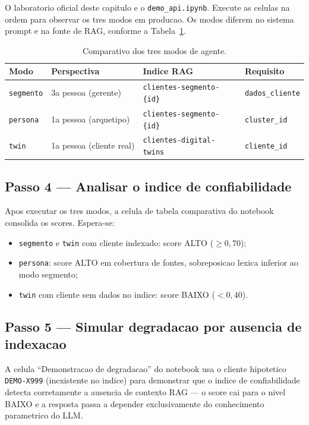 O laboratorio oficial deste capitulo e o \texttt{demo\_api.ipynb}.
Execute as celulas na ordem para observar os tres modos em producao.
Os modos diferem no sistema prompt e na fonte de RAG,
conforme a Tabela~\ref{tab:modos_agente}.

\begin{table}[ht]
\centering
\caption{Comparativo dos tres modos de agente.}
\label{tab:modos_agente}
\begin{tabular}{llll}
\toprule
\textbf{Modo} & \textbf{Perspectiva} & \textbf{Indice RAG} & \textbf{Requisito} \\
\midrule
\texttt{segmento} & 3a pessoa (gerente)    & \texttt{clientes-segmento-\{id\}} & \texttt{dados\_cliente} \\
\texttt{persona}  & 1a pessoa (arquetipo)  & \texttt{clientes-segmento-\{id\}} & \texttt{cluster\_id} \\
\texttt{twin}     & 1a pessoa (cliente real) & \texttt{clientes-digital-twins} & \texttt{cliente\_id} \\
\bottomrule
\end{tabular}
\end{table}

\subsection{Passo 4 --- Analisar o indice de confiabilidade}

Apos executar os tres modos, a celula de tabela comparativa do notebook
consolida os scores. Espera-se:

\begin{itemize}[leftmargin=*]
  \item \texttt{segmento} e \texttt{twin} com cliente indexado:
        score ALTO ($\geq 0{,}70$);
  \item \texttt{persona}: score ALTO em cobertura de fontes,
        sobreposicao lexica inferior ao modo segmento;
  \item \texttt{twin} com cliente sem dados no indice:
        score BAIXO ($< 0{,}40$).
\end{itemize}

\subsection{Passo 5 --- Simular degradacao por ausencia de indexacao}

A celula ``Demonstracao de degradacao'' do notebook usa o cliente
hipotetico \texttt{DEMO-X999} (inexistente no indice) para demonstrar
que o indice de confiabilidade detecta corretamente a ausencia de
contexto RAG --- o score cai para o nivel BAIXO e a resposta passa a
depender exclusivamente do conhecimento parametrico do LLM.

